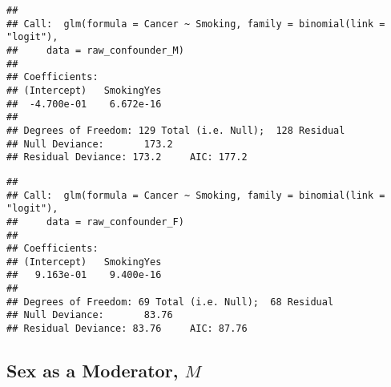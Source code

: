 \documentclass[
]{book}
\newenvironment{Shaded}{\begin{snugshade}}{\end{snugshade}}
\newcommand{\AttributeTok}[1]{\textcolor[rgb]{0.77,0.63,0.00}{#1}}
\newcommand{\CommentTok}[1]{\textcolor[rgb]{0.56,0.35,0.01}{\textit{#1}}}
\newcommand{\FunctionTok}[1]{\textcolor[rgb]{0.00,0.00,0.00}{#1}}
\newcommand{\NormalTok}[1]{#1}
\newcommand{\OtherTok}[1]{\textcolor[rgb]{0.56,0.35,0.01}{#1}}
\newcommand{\SpecialCharTok}[1]{\textcolor[rgb]{0.00,0.00,0.00}{#1}}
\newcommand{\StringTok}[1]{\textcolor[rgb]{0.31,0.60,0.02}{#1}}
\begin{document}
\begin{verbatim}
## 
## Call:  glm(formula = Cancer ~ Smoking, family = binomial(link = "logit"), 
##     data = raw_confounder_M)
## 
## Coefficients:
## (Intercept)   SmokingYes  
##  -4.700e-01    6.672e-16  
## 
## Degrees of Freedom: 129 Total (i.e. Null);  128 Residual
## Null Deviance:       173.2 
## Residual Deviance: 173.2     AIC: 177.2
\end{verbatim}

\begin{Shaded}
\end{Shaded}

\begin{verbatim}
## 
## Call:  glm(formula = Cancer ~ Smoking, family = binomial(link = "logit"), 
##     data = raw_confounder_F)
## 
## Coefficients:
## (Intercept)   SmokingYes  
##   9.163e-01    9.400e-16  
## 
## Degrees of Freedom: 69 Total (i.e. Null);  68 Residual
## Null Deviance:       83.76 
## Residual Deviance: 83.76     AIC: 87.76
\end{verbatim}

\hypertarget{sex-as-a-moderator-m}{%
\subsection{\texorpdfstring{Sex as a Moderator, \(M\)}{Sex as a Moderator, M}}\label{sex-as-a-moderator-m}}
\end{document}
